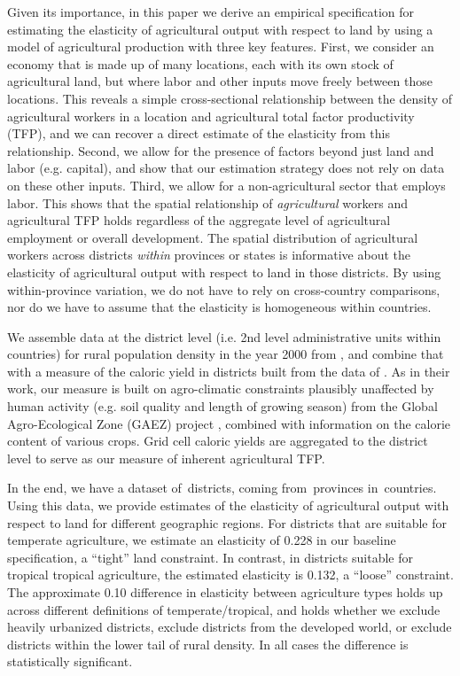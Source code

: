 \documentclass[11pt]{article}
\begin{document}
Given its importance, in this paper we derive an empirical specification for estimating the elasticity of agricultural output with respect to land by using a model of agricultural production with three key features. First, we consider an economy that is made up of many locations, each with its own stock of agricultural land, but where labor and other inputs move freely between those locations. This reveals a simple cross-sectional relationship between the density of agricultural workers in a location and agricultural total factor productivity (TFP), and we can recover a direct estimate of the elasticity from this relationship. Second, we allow for the presence of factors beyond just land and labor (e.g. capital), and show that our estimation strategy does not rely on data on these other inputs. Third, we allow for a non-agricultural sector that employs labor. This shows that the spatial relationship of \textit{agricultural} workers and agricultural TFP holds regardless of the aggregate level of agricultural employment or overall development. The spatial distribution of agricultural workers across districts \textit{within} provinces or states is informative about the elasticity of agricultural output with respect to land in those districts. By using within-province variation, we do not have to rely on cross-country comparisons, nor do we have to assume that the elasticity is homogeneous within countries.

We assemble data at the district level (i.e. 2nd level administrative units within countries) for rural population density in the year 2000 from \citet{hyde31}, and combine that with a measure of the caloric yield in districts built from the data of \citet{galorozak2016}. As in their work, our measure is built on agro-climatic constraints plausibly unaffected by human activity (e.g. soil quality and length of growing season) from the Global Agro-Ecological Zone (GAEZ) project \citep{gaez}, combined with information on the calorie content of various crops. Grid cell caloric yields are aggregated to the district level to serve as our measure of inherent agricultural TFP.

In the end, we have a dataset of\districts \ districts, coming from\provinces \ provinces in\countries \ countries. Using this data, we provide estimates of the elasticity of agricultural output with respect to land for different geographic regions. For districts that are suitable for temperate agriculture, we estimate an elasticity of 0.228 in our baseline specification, a ``tight'' land constraint. In contrast, in districts suitable for tropical tropical agriculture, the estimated elasticity is 0.132, a ``loose'' constraint. The approximate 0.10 difference in elasticity between agriculture types holds up across different definitions of temperate/tropical, and holds whether we exclude heavily urbanized districts, exclude districts from the developed world, or exclude districts within the lower tail of rural density. In all cases the difference is statistically significant.
\end{document}

